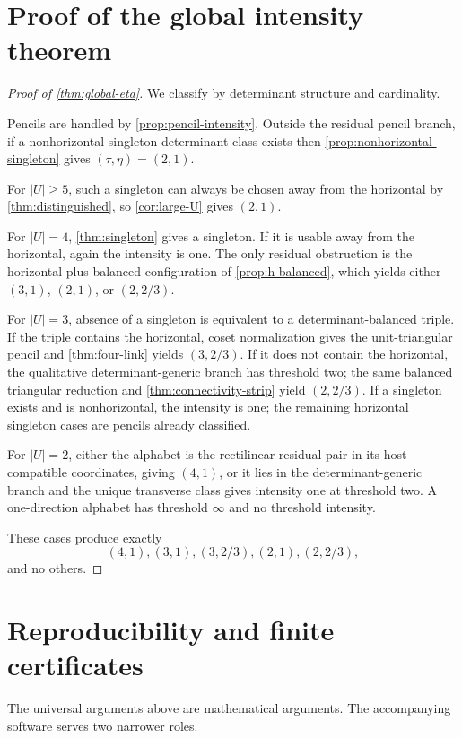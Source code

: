 \documentclass[11pt]{article}
\theoremstyle{definition}
\begin{document}
\section{Proof of the global intensity theorem}\label{sec:global-eta-proof}
\begin{proof}[Proof of \cref{thm:global-eta}]
We classify by determinant structure and cardinality.

Pencils are handled by \cref{prop:pencil-intensity}.  Outside the residual pencil branch, if a nonhorizontal singleton determinant class exists then \cref{prop:nonhorizontal-singleton} gives $(\tau,\eta)=(2,1)$.

For $|U|\ge5$, such a singleton can always be chosen away from the horizontal by \cref{thm:distinguished}, so \cref{cor:large-U} gives $(2,1)$.

For $|U|=4$, \cref{thm:singleton} gives a singleton.  If it is usable away from the horizontal, again the intensity is one.  The only residual obstruction is the horizontal-plus-balanced configuration of \cref{prop:h-balanced}, which yields either $(3,1)$, $(2,1)$, or $(2,2/3)$.

For $|U|=3$, absence of a singleton is equivalent to a determinant-balanced triple.  If the triple contains the horizontal, coset normalization gives the unit-triangular pencil and \cref{thm:four-link} yields $(3,2/3)$.  If it does not contain the horizontal, the qualitative determinant-generic branch has threshold two; the same balanced triangular reduction and \cref{thm:connectivity-strip} yield $(2,2/3)$.  If a singleton exists and is nonhorizontal, the intensity is one; the remaining horizontal singleton cases are pencils already classified.

For $|U|=2$, either the alphabet is the rectilinear residual pair in its host-compatible coordinates, giving $(4,1)$, or it lies in the determinant-generic branch and the unique transverse class gives intensity one at threshold two.  A one-direction alphabet has threshold $\infty$ and no threshold intensity.

These cases produce exactly
\[
(4,1),(3,1),(3,2/3),(2,1),(2,2/3),
\]
and no others.
\end{proof}

\section{Reproducibility and finite certificates}\label{sec:repro}
The universal arguments above are mathematical arguments.  The accompanying software serves two narrower roles.
\end{document}

